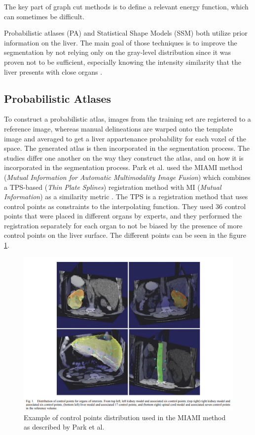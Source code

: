 \documentclass[]{article}
\begin{document}
The key part of graph cut methods is to define a relevant energy
function, which can sometimes be difficult.

Probabilistic atlases (PA) and Statistical Shape Models (SSM) both
utilize prior information on the liver. The main goal of those
techniques is to improve the segmentation by not relying only on the
gray-level distribution since it was proven not to be sufficient,
especially knowing the intensity similarity that the liver presents with
close organs \cite{Zhou2006, Park2003, Slagmolen2007, Rikxoort2007}.
	
\subsection*{Probabilistic Atlases}

To construct a probabilistic atlas, images from the training set are
registered to a reference image, whereas manual delineations are warped
onto the template image and averaged to get a liver appartenance
probability for each voxel of the space. The generated atlas is then
incorporated in the segmentation process. The studies differ one another
on the way they construct the atlas, and on how it is incorporated in
the segmentation process. 
Park et al. used the MIAMI method (\emph{Mutual Information for Automatic
	Multimodality Image Fusion}) which combines a TPS-based (\emph{Thin
	Plate Splines}) registration method with MI (\emph{Mutual Information})
as a similarity metric \cite{Park2003}. The TPS is a registration method that uses
control points as constraints to the interpolating function. They used
36 control points that were placed in different organs by experts, and
they performed the registration separately for each organ to not be
biased by the presence of more control points on the liver surface. The
different points can be seen in the figure \ref{Park2003_Fig1}.

\begin{figure}
	\centering
	\includegraphics[width=0.7\linewidth]{images/image34}
	\caption{Example of control points distribution used in the MIAMI method as described by Park et al. \cite{Park2003}}
	\label{Park2003_Fig1}
\end{figure}
\end{document}

